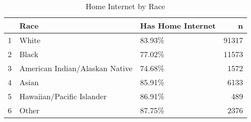 \begin{table}[ht]
\centering
\begin{tabular}{rllr}
  \hline
 & Race & Has Home Internet & n \\ 
  \hline
1 & White & 83.93\% & 91317 \\ 
  2 & Black & 77.02\% & 11573 \\ 
  3 & American Indian/Alaskan Native & 74.68\% & 1572 \\ 
  4 & Asian & 85.91\% & 6133 \\ 
  5 & Hawaiian/Pacific Islander & 86.91\% & 489 \\ 
  6 & Other & 87.75\% & 2376 \\ 
   \hline
\end{tabular}
\caption{Home Internet by Race} 
\end{table}
